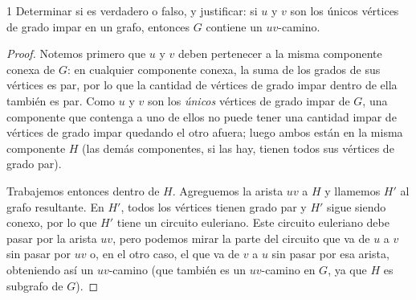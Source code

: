 \begin{ejercicio}{1}
	Determinar si es verdadero o falso, y justificar: si \( u \) y \( v \) son los únicos vértices de grado impar en un grafo, entonces \( G \) contiene un \( uv \)-camino.
\end{ejercicio}
\begin{proof}
	Notemos primero que \( u \) y \( v \) deben pertenecer a la misma componente conexa de \( G \): en cualquier componente conexa, la suma de los grados de sus vértices es par, por lo que la cantidad de vértices de grado impar dentro de ella también es par. Como \( u \) y \( v \) son los \emph{únicos} vértices de grado impar de \( G \), una componente que contenga a uno de ellos no puede tener una cantidad impar de vértices de grado impar quedando el otro afuera; luego ambos están en la misma componente \( H \) (las demás componentes, si las hay, tienen todos sus vértices de grado par).

	Trabajemos entonces dentro de \( H \). Agreguemos la arista \( uv \) a \( H \) y llamemos \( H' \) al grafo resultante. En \( H' \), todos los vértices tienen grado par y \( H' \) sigue siendo conexo, por lo que \( H' \) tiene un circuito euleriano. Este circuito euleriano debe pasar por la arista \( uv \), pero podemos mirar la parte del circuito que va de \( u \) a \( v \) sin pasar por \( uv \) o, en el otro caso, el que va de \( v \) a \( u \) sin pasar por esa arista, obteniendo así un \( uv \)-camino (que también es un \( uv \)-camino en \( G \), ya que \( H \) es subgrafo de \( G \)).
\end{proof}

\vspace{0.5cm}

